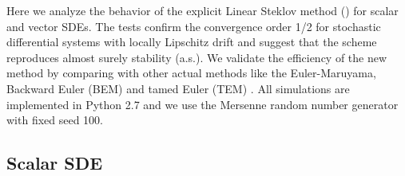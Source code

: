 	Here we analyze the behavior of the explicit Linear Steklov method (\SM) for scalar and vector SDEs. 
The tests confirm the convergence order 1/2 for stochastic differential systems with locally Lipschitz drift 
and suggest that the \SM scheme reproduces almost surely stability (a.s.). We validate the efficiency of the new 
method  by comparing with other actual methods like the Euler-Maruyama, Backward Euler (BEM) \cite{Mao2013} and tamed 
Euler (TEM) \cite{Hutzenthaler2012c}. All simulations are implemented in Python 2.7 and we use the Mersenne random 
number generator with fixed seed 100.

\subsection{Scalar SDE}	
	
